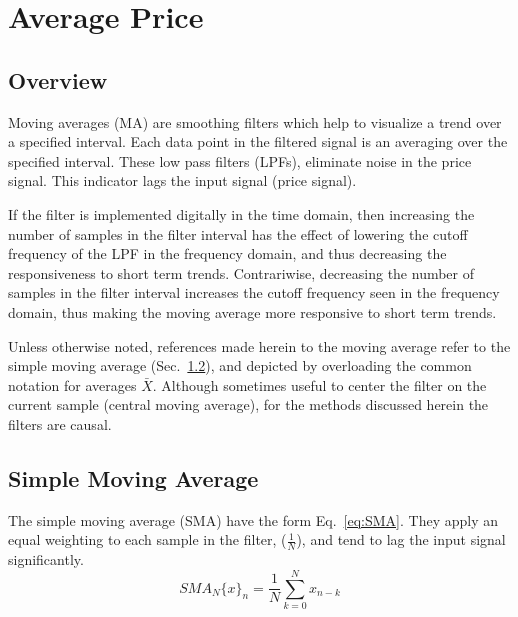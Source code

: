 \chapter{Average Price}

\section{Overview}
Moving averages (MA) are smoothing filters which help to visualize a trend over a specified interval.  Each data point in the filtered signal is an averaging over the specified interval. These low pass filters (LPFs), eliminate noise in the price signal.  This indicator lags the input signal (price signal).
\par
If the filter is implemented digitally in the time domain, then increasing the number of samples in the filter interval has the effect of lowering the cutoff frequency of the LPF in the frequency domain, and thus decreasing the responsiveness to short term trends.  Contrariwise, decreasing the number of samples in the filter interval increases the cutoff frequency seen in the frequency domain, thus making the moving average more responsive to short term trends.
\par
Unless otherwise noted, references made herein to the moving average refer to the simple moving average (Sec.~\ref{price:SMA}), and depicted by overloading the common notation for averages $\bar{X}$.  Although sometimes useful to center the filter on the current sample (central moving average), for the methods discussed herein the filters are causal.
\par

\section{Simple Moving Average}\label{price:SMA}
The simple moving average (SMA) have the form Eq.~\eqref{eq:SMA}. They apply an equal weighting to each sample in the filter, ($\frac{1}{N}$), and tend to lag the input signal significantly.
%
\begin{equation}
\label{eq:SMA}
SMA_{N}\{x\}_{n}=\frac{1}{N}\sum\limits_{k=0}^{N}x_{n-k}
\end{equation}
%
\par
%
